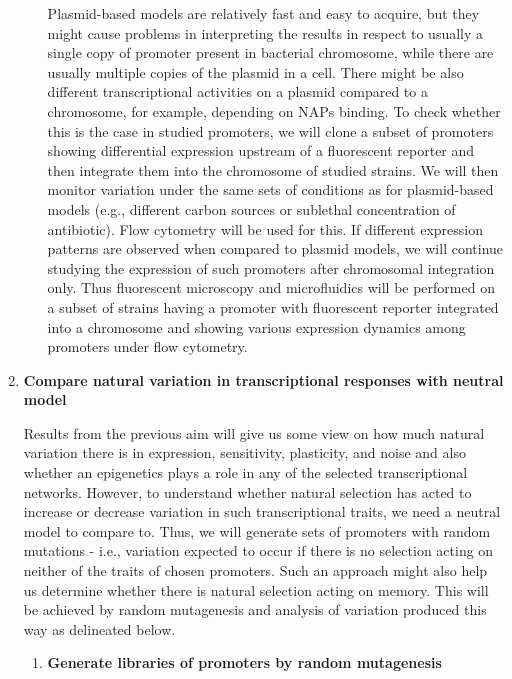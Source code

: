 \begin{enumerate}[font=\bfseries]
\begin{enumerate}[font=\bfseries]
        Plasmid-based models are relatively fast and easy to acquire, but they might cause problems in interpreting the results in respect to usually a single copy of promoter present in bacterial chromosome, while there are usually multiple copies of the plasmid in a cell.
        There might be also different transcriptional activities on a plasmid compared to a chromosome, for example, depending on NAPs binding.
        To check whether this is the case in studied promoters, we will clone a subset of promoters showing differential expression upstream of a fluorescent reporter and then integrate them into the chromosome of studied strains.
        We will then monitor variation under the same sets of conditions as for plasmid-based models (e.g., different carbon sources or sublethal concentration of antibiotic).
        Flow cytometry will be used for this.
        If different expression patterns are observed when compared to plasmid models, we will continue studying the expression of such promoters after chromosomal integration only.
        Thus fluorescent microscopy and microfluidics will be performed on a subset of strains having a promoter with fluorescent reporter integrated into a chromosome and showing various expression dynamics among promoters under flow cytometry.

    \end{enumerate}
    
    \item \textbf{Compare natural variation in transcriptional responses with neutral model}
    
    Results from the previous aim will give us some view on how much natural variation there is in expression, sensitivity, plasticity, and noise and also whether an epigenetics plays a role in any of the selected transcriptional networks.
    However, to understand whether natural selection has acted to increase or decrease variation in such transcriptional traits, we need a neutral model to compare to.
    Thus, we will generate sets of promoters with random mutations - i.e., variation expected to occur if there is no selection acting on neither of the traits of chosen promoters.
    Such an approach might also help us determine whether there is natural selection acting on memory.
    This will be achieved by random mutagenesis and analysis of variation produced this way as delineated below.

    \begin{enumerate}[font=\bfseries]
    
        \item \textbf{Generate libraries of promoters by random mutagenesis}
        

\end{enumerate}
\end{enumerate}
